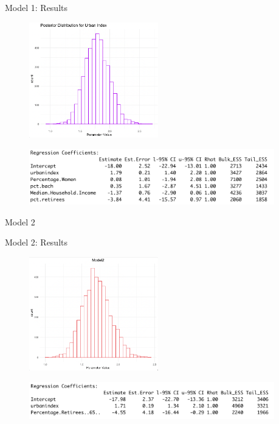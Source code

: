 \documentclass{beamer}
\begin{document}
\begin{frame}{Model 1: Results}
    \begin{center}
        \begin{figure}
            \includegraphics[width=0.5\textwidth]{plots/post_urbanindex_model1.png}
        \end{figure}
        \begin{figure}
            \includegraphics[width=0.95\textwidth]{plots/model1_summary_output.png}
        \end{figure}
    \end{center}
\end{frame}


\begin{frame}{Model 2}
\end{frame}


\begin{frame}{Model 2: Results}
    \begin{figure}
        \includegraphics[width=0.5\textwidth]{plots/model2_postui.png}
    \end{figure}
    \begin{figure}
        \includegraphics[width=0.95\textwidth]{plots/model2_coeff.png}
    \end{figure}
\end{frame}
\end{document}
